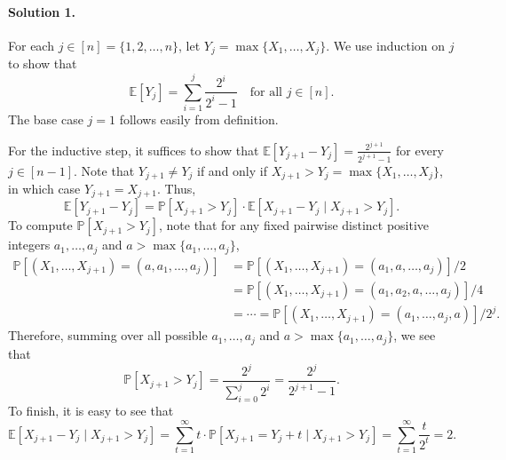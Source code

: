 \documentclass{article}
\begin{document}
\paragraph{Solution 1.}
For each $j \in [n] = \{1, 2, \ldots, n\}$, let $Y_j = \max\{X_1, \ldots, X_j\}$. We use induction on $j$ to show that
\[
\mathbb{E}[Y_j] = \sum_{i=1}^j \frac{2^i}{2^i - 1} \quad \text{for all } j \in [n].
\]
The base case $j = 1$ follows easily from definition.

For the inductive step, it suffices to show that $\mathbb{E}[Y_{j+1} - Y_j] = \frac{2^{j+1}}{2^{j+1} - 1}$ for every $j \in [n-1]$. Note that $Y_{j+1} \neq Y_j$ if and only if $X_{j+1} > Y_j = \max\{X_1, \ldots, X_j\}$, in which case $Y_{j+1} = X_{j+1}$. Thus,
\[
\mathbb{E}[Y_{j+1} - Y_j] = \mathbb{P}[X_{j+1} > Y_j] \cdot \mathbb{E}[X_{j+1} - Y_j \mid X_{j+1} > Y_j].
\]
To compute $\mathbb{P}[X_{j+1} > Y_j]$, note that for any fixed pairwise distinct positive integers $a_1, \ldots, a_j$ and $a > \max\{a_1, \ldots, a_j\}$,
\begin{align*}
\mathbb{P}[(X_1, \ldots, X_{j+1}) = (a, a_1, \ldots, a_j)] &= \mathbb{P}[(X_1, \ldots, X_{j+1}) = (a_1, a, \ldots, a_j)]/2 \\
&= \mathbb{P}[(X_1, \ldots, X_{j+1}) = (a_1, a_2, a, \ldots, a_j)]/4 \\
&= \cdots = \mathbb{P}[(X_1, \ldots, X_{j+1}) = (a_1, \ldots, a_j, a)]/2^j.
\end{align*}
Therefore, summing over all possible $a_1, \ldots, a_j$ and $a > \max\{a_1, \ldots, a_j\}$, we see that
\[
\mathbb{P}[X_{j+1} > Y_j] = \frac{2^j}{\sum_{i=0}^j 2^i} = \frac{2^j}{2^{j+1} - 1}.
\]
To finish, it is easy to see that
\[
\mathbb{E}[X_{j+1} - Y_j \mid X_{j+1} > Y_j] = \sum_{t=1}^{\infty} t \cdot \mathbb{P}[X_{j+1} = Y_j + t \mid X_{j+1} > Y_j] = \sum_{t=1}^{\infty} \frac{t}{2^t} = 2.
\]
\end{document}
